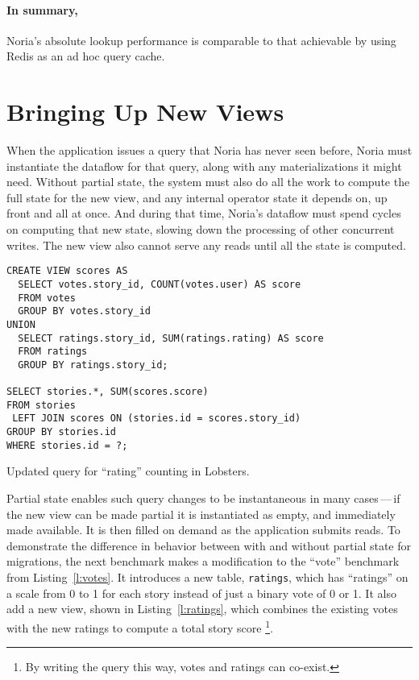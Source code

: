 \paragraph{In summary,} Noria's absolute lookup performance is comparable to
that achievable by using Redis as an ad hoc query cache.

\section{Bringing Up New Views}
\label{s:eval:mig}

When the application issues a query that Noria has never seen before, Noria must
instantiate the dataflow for that query, along with any materializations it
might need. Without partial state, the system must also do all the work to
compute the full state for the new view, and any internal operator state it
depends on, up front and all at once. And during that time, Noria's dataflow
must spend cycles on computing that new state, slowing down the processing of
other concurrent writes. The new view also cannot serve any reads until all the
state is computed.

\begin{listing}[h]
  \begin{verbatim}
CREATE VIEW scores AS
  SELECT votes.story_id, COUNT(votes.user) AS score
  FROM votes
  GROUP BY votes.story_id
UNION
  SELECT ratings.story_id, SUM(ratings.rating) AS score
  FROM ratings
  GROUP BY ratings.story_id;

SELECT stories.*, SUM(scores.score)
FROM stories
 LEFT JOIN scores ON (stories.id = scores.story_id)
GROUP BY stories.id
WHERE stories.id = ?;
  \end{verbatim}
  \caption{Updated query for ``rating'' counting in Lobsters.}
  \label{l:ratings}
\end{listing}

Partial state enables such query changes to be instantaneous in many
cases\,---\,if the new view can be made partial it is instantiated as empty, and
immediately made available. It is then filled on demand as the application
submits reads. To demonstrate the difference in behavior between with and
without partial state for migrations, the next benchmark makes a modification to
the ``vote'' benchmark from Listing~\ref{l:votes}. It introduces a new table,
\texttt{ratings}, which has ``ratings'' on a scale from 0 to 1 for each story
instead of just a binary vote of 0 or 1. It also add a new view, shown in
Listing~\vref{l:ratings}, which combines the existing votes with the new ratings
to compute a total story score%
\footnote{By writing the query this way, votes and ratings can co-exist.}.

